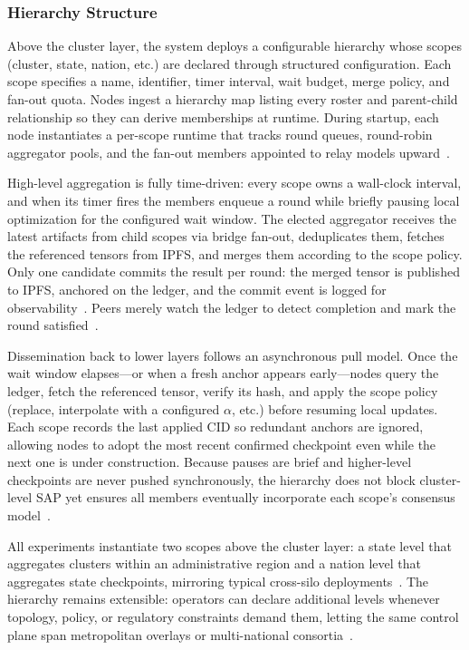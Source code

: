 \subsubsection{Hierarchy Structure}
\label{subsubsec:system-architecture-hierarchy}

Above the cluster layer, the system deploys a configurable hierarchy whose scopes (cluster, state, nation, etc.) are declared through structured configuration. Each scope specifies a name, identifier, timer interval, wait budget, merge policy, and fan-out quota. Nodes ingest a hierarchy map listing every roster and parent-child relationship so they can derive memberships at runtime. During startup, each node instantiates a per-scope runtime that tracks round queues, round-robin aggregator pools, and the fan-out members appointed to relay models upward~\cite{BCFramework,TowardsFederatedLearningScale,Mitra2023TAHFL}.

High-level aggregation is fully time-driven: every scope owns a wall-clock interval, and when its timer fires the members enqueue a round while briefly pausing local optimization for the configured wait window. The elected aggregator receives the latest artifacts from child scopes via bridge fan-out, deduplicates them, fetches the referenced tensors from IPFS, and merges them according to the scope policy. Only one candidate commits the result per round: the merged tensor is published to IPFS, anchored on the ledger, and the commit event is logged for observability~\cite{BCFramework,TrustDFL}. Peers merely watch the ledger to detect completion and mark the round satisfied~\cite{BCFramework}.

Dissemination back to lower layers follows an asynchronous pull model. Once the wait window elapses---or when a fresh anchor appears early---nodes query the ledger, fetch the referenced tensor, verify its hash, and apply the scope policy (replace, interpolate with a configured $\alpha$, etc.) before resuming local updates. Each scope records the last applied CID so redundant anchors are ignored, allowing nodes to adopt the most recent confirmed checkpoint even while the next one is under construction. Because pauses are brief and higher-level checkpoints are never pushed synchronously, the hierarchy does not block cluster-level SAP yet ensures all members eventually incorporate each scope’s consensus model~\cite{TowardsFederatedLearningScale,BCFramework}.

All experiments instantiate two scopes above the cluster layer: a state level that aggregates clusters within an administrative region and a nation level that aggregates state checkpoints, mirroring typical cross-silo deployments~\cite{Kairouz2021,Mitra2023TAHFL}. The hierarchy remains extensible: operators can declare additional levels whenever topology, policy, or regulatory constraints demand them, letting the same control plane span metropolitan overlays or multi-national consortia~\cite{BCFramework}.